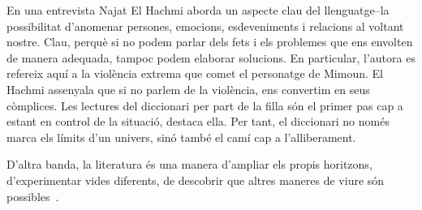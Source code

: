 En una entrevista Najat El Hachmi aborda un aspecte clau del llenguatge--la possibilitat d'anomenar persones, emocions, esdeveniments i relacions al voltant nostre.
Clau, perquè si no podem parlar dels fets i els problemes que ens envolten de manera adequada, tampoc podem elaborar solucions.
En particular, l'autora es refereix aquí a la violència extrema que comet el personatge de Mimoun.
El Hachmi assenyala que si no parlem de la violència, ens convertim en seus còmplices.
Les lectures del diccionari per part de la filla són el primer pas cap a estant en control de la situació, destaca ella.
Per tant, el diccionari no només marca els límits d'un univers, sinó també el camí cap a l'alliberament.

D'altra banda, la literatura és una manera d'ampliar els propis horitzons, d'experimentar vides diferents, de descobrir que altres maneres de viure són possibles~\autocite{HaAM2011}.

\begin{comment}
  Quotes (moved)
  ---------------
\end{comment}
